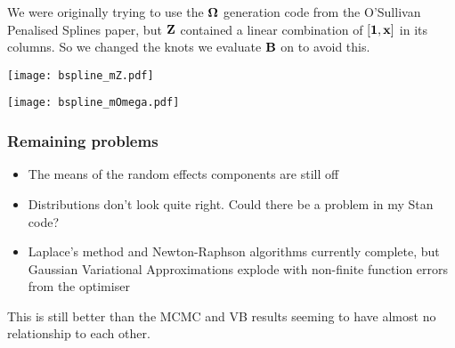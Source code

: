 \documentclass{beamer}
\begin{document}
\begin{frame}
We were originally  trying to use the ${\boldsymbol \Omega}$ generation code from the O'Sullivan Penalised 
Splines paper, but ${\bf Z}$ contained a linear combination of $[{\bf 1}, {\bf x}]$ in its columns. So 
we changed the knots we evaluate ${\bf B}$ on to avoid this.
\end{frame}

\begin{frame}
	\texttt{[image: bspline\_mZ.pdf]}
\end{frame}

\begin{frame}
	\texttt{[image: bspline\_mOmega.pdf]}
\end{frame}

\begin{frame}
\frametitle{Remaining problems}
\begin{itemize}
\item The means of the random effects components are still off
\item Distributions don't look quite right. Could there be a problem in my Stan code?
\item Laplace's method and Newton-Raphson algorithms currently complete, but
			Gaussian Variational Approximations explode with non-finite function
			errors from the optimiser
\end{itemize}

This is still better than the MCMC and VB results seeming to have almost no relationship
to each other.

\end{frame}
\end{document}
